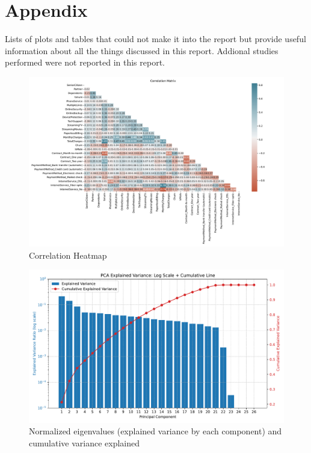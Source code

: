 \documentclass[a4paper,11pt]{article}
\begin{document}
\section{Appendix}
Lists of plots and tables that could not make it into the report but provide useful information about all the things discussed in this report. Addional studies performed were not reported in this report.
\begin{figure}[H]
\centering
\includegraphics[width=\linewidth]{figures/understanding/correlation_matrix.pdf}
\caption{Correlation Heatmap}
\end{figure}
\begin{figure}[H]
\centering
\includegraphics[width=0.8\linewidth]{figures/understanding/pca_explained_variance.pdf}
\caption{Normalized eigenvalues (explained variance by each component) and cumulative variance explained}
\label{fig:enter-label}
\end{figure}
\end{document}

